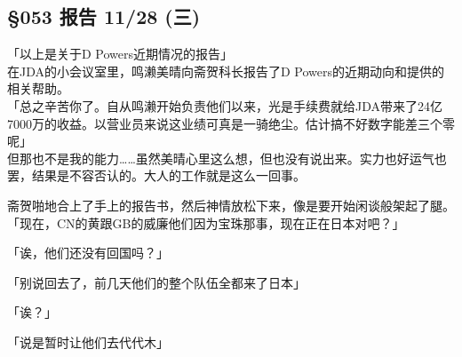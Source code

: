 \subsection{§053 报告 11/28 (三)}

「以上是关于D Powers近期情况的报告」\\

在JDA的小会议室里，鸣濑美晴向斋贺科长报告了D Powers的近期动向和提供的相关帮助。\\

「总之辛苦你了。自从鸣濑开始负责他们以来，光是手续费就给JDA带来了24亿7000万的收益。以营业员来说这业绩可真是一骑绝尘。估计搞不好数字能差三个零呢」\\

但那也不是我的能力……虽然美晴心里这么想，但也没有说出来。实力也好运气也罢，结果是不容否认的。大人的工作就是这么一回事。

斋贺啪地合上了手上的报告书，然后神情放松下来，像是要开始闲谈般架起了腿。\\

「现在，CN的黄跟GB的威廉他们因为宝珠那事，现在正在日本对吧？」

「诶，他们还没有回国吗？」

「别说回去了，前几天他们的整个队伍全都来了日本」

「诶？」

「说是暂时让他们去代代木」

